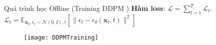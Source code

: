 \begin{frame}{Quá trình học Offline (Training $\text{DDPM}$ )}
	\textbf{Hàm loss}: $\mathcal{L} = \sum_{t=1}^{T} \mathcal{L}_t$. $\mathcal{L}_{t}= \mathbb{E}_{\mathbf{x}_{0}, \epsilon_t \sim \mathcal{N}(0, I), t} \left[ \| \epsilon_t - \epsilon_\theta(\mathbf{x}_t, t) \|^2 \right]$
	
	\begin{figure}
		\centering
		\texttt{[image: DDPMTraining]}
	\end{figure}
\end{frame}

%	

